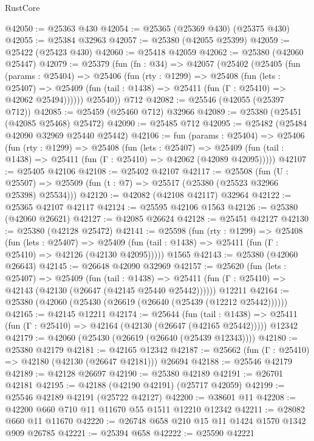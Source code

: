 \begin{lexlean}{RustCore}
\begin{coremodule}
@42050 := @25363 @430
@42054 := @25365 (@25369 @430) (@25375 @430)
@42055 := @25384 @32963
@42057 := @25380 (@42055 @25399)
@42059 := @25422 (@25423 @430)
@42060 := @25418 @42059
@42062 := @25380 (@42060 @25447)
@42079 := @25379
    (fun (fn : @34) =>
    @42057
      (@25402
        (@25405
          (fun (params : @25404) =>
          @25406
            (fun (rty : @1299) =>
            @25408
              (fun (lets : @25407) =>
              @25409 (fun (tail : @1438) => @25411 (fun (Γ : @25410) => @42062 @25494))))))
        @25540))
    @712
@42082 := @25546 (@42055 (@25397 @712))
@42085 := @25459 (@25460 @712) @32966
@42089 := @25380 (@25451 (@42085 @25468) @25472)
@42090 := @25485 @712
@42095 := @25482 (@25484 @42090 @32969 @25440 @25442)
@42106 := fun (params : @25404) =>
  @25406
    (fun (rty : @1299) =>
    @25408
      (fun (lets : @25407) =>
      @25409 (fun (tail : @1438) => @25411 (fun (Γ : @25410) => @42062 (@42089 @42095)))))
@42107 := @25405 @42106
@42108 := @25402 @42107
@42117 := @25508
    (fun (U : @25507) => @25509 (fun (t : @7) => @25517 (@25380 (@25523 @32966 @25398) @25534)))
@42120 := @42082 (@42108 @42117) @32964
@42122 := @25365 @42107 @42117
@42124 := @25595 @42106 @1563
@42126 := @25380 (@42060 @26621)
@42127 := @42085 @26624
@42128 := @25451 @42127
@42130 := @25380 (@42128 @25472)
@42141 := @25598
    (fun (rty : @1299) =>
    @25408
      (fun (lets : @25407) =>
      @25409 (fun (tail : @1438) => @25411 (fun (Γ : @25410) => @42126 (@42130 @42095)))))
    @1565
@42143 := @25380 (@42060 @26643)
@42145 := @26648 @42090 @32969
@42157 := @25620
    (fun (lets : @25407) =>
    @25409
      (fun (tail : @1438) =>
      @25411 (fun (Γ : @25410) => @42143 (@42130 (@26647 (@42145 @25440 @25442))))))
    @12211
@42164 := @25380 (@42060 (@25430 (@26619 (@26640 (@25439 (@12212 @25442))))))
@42165 := @42145 @12211
@42174 := @25644
    (fun (tail : @1438) => @25411 (fun (Γ : @25410) => @42164 (@42130 (@26647 (@42165 @25442)))))
    @12342
@42179 := @42060 (@25430 (@26619 (@26640 (@25439 @12343))))
@42180 := @25380 @42179
@42181 := @42165 @12342
@42187 := @25662 (fun (Γ : @25410) => @42180 (@42130 (@26647 @42181))) @26694
@42188 := @25546 @42179
@42189 := @42128 @26697
@42190 := @25380 @42189
@42191 := @26701 @42181
@42195 := @42188 (@42190 @42191) (@25717 @42059)
@42199 := @25546 @42189 @42191 (@25722 @42127)
@42200 := @38601 @11
@42208 := @42200 @660 @710 @11 @11670 @55 @1511 @12210 @12342
@42211 := @28082 @660 @11 @11670
@42220 := @26748 @658 @210 @15 @11 @1424 @1570 @1342 @909 @26785
@42221 := @25394 @658
@42222 := @25590 @42221

\end{coremodule}
\end{lexlean}
